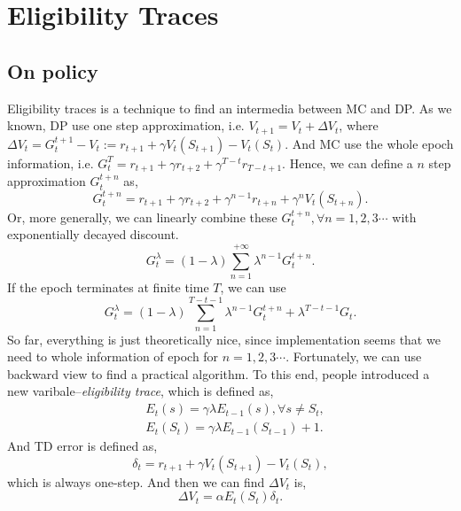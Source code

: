\documentclass[11pt,a4paper]{article}
\begin{document}
\section{Eligibility Traces}
\subsection{On policy}
Eligibility traces\cite{sutton1998introduction} is a technique to find an intermedia between MC and DP. As we known, DP use one step approximation, i.e. $V_{t+1} = V_t +\Delta V_t$, where $\Delta V_t = G_{t}^{t+1} - V_t := r_{t+1} + \gamma V_t(S_{t+1}) - V_t(S_t)$. And MC use the whole epoch information, i.e. $G_{t}^{T} = r_{t+1} + \gamma r_{t+2} + \gamma^{T-t}r_{T-t+1}$. Hence, we can define a $n$ step approximation $G_{t}^{t+n}$ as,
\begin{equation}
G_{t}^{t+n} = r_{t+1} + \gamma r_{t+2} + \gamma^{n-1}r_{t+n} + \gamma^n V_t(S_{t+n}).
\end{equation}
Or, more generally, we can linearly combine these $G_{t}^{t+n}, \forall n =1,2,3\cdots$ with exponentially decayed discount.
\begin{equation}
G_{t}^{\lambda} = (1-\lambda) \sum_{n=1}^{+\infty} \lambda^{n-1} G_t^{t+n}.
\end{equation}
If the epoch terminates at finite time $T$, we can use 
\begin{equation}
G_t^{\lambda} = (1-\lambda)\sum_{n=1}^{T-t-1}\lambda^{n-1}G_t^{t+n} + \lambda^{T-t-1}G_t.
\end{equation}
So far, everything is just theoretically nice, since implementation seems that we need to whole information of epoch for $n =1,2,3\cdots$. Fortunately, we can use backward view to find a practical algorithm. To this end, people introduced a new varibale--\emph{eligibility trace}, which is defined as,
\begin{eqnarray}
& E_t(s) = \gamma \lambda E_{t-1}(s), \forall s \neq S_t, \\ 
& E_t(S_t) = \gamma \lambda E_{t-1}(S_{t-1}) + 1.
\end{eqnarray}
And TD error is defined as, 
\begin{equation}
    \delta_t = r_{t+1} + \gamma V_t(S_{t+1}) - V_t(S_t),
\end{equation}
which is always one-step. And then we can find $\Delta V_t$ is,
\begin{equation}
    \Delta V_t = \alpha E_t(S_t) \delta_t.
\end{equation}
\end{document}
